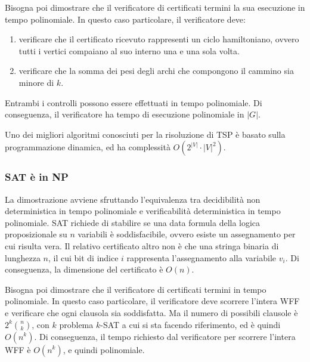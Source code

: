 Bisogna poi dimostrare che il verificatore di certificati termini la sua esecuzione in tempo polinomiale.
In questo caso particolare, il verificatore deve:
\begin{enumerate}
    \item verificare che il certificato ricevuto rappresenti un ciclo hamiltoniano, ovvero tutti i vertici compaiano al suo interno una e una sola volta.
    \item verificare che la somma dei pesi degli archi che compongono il cammino sia minore di $k$.
\end{enumerate}
Entrambi i controlli possono essere effettuati in tempo polinomiale.
Di conseguenza, il verificatore ha tempo di esecuzione polinomiale in $|G|$.

Uno dei migliori algoritmi conosciuti per la risoluzione di TSP è basato sulla programmazione dinamica, ed ha complessità $O(2^{|V|} \cdot |V|^2)$.

\subsubsection{SAT è in NP}
La dimostrazione avviene sfruttando l'equivalenza tra decidibilità non deterministica in tempo polinomiale e verificabilità deterministica in tempo polinomiale.
SAT richiede di stabilire se una data formula della logica proposizionale su $n$ variabili è soddisfacibile, ovvero esiste un assegnamento per cui risulta vera.
Il relativo certificato altro non è che una stringa binaria di lunghezza $n$, il cui bit di indice $i$ rappresenta l'assegnamento alla variabile $v_i$.
Di conseguenza, la dimensione del certificato è $O(n)$.

Bisogna poi dimostrare che il verificatore di certificati termini in tempo polinomiale. In questo caso particolare, il verificatore deve scorrere l'intera WFF e verificare che ogni clausola sia soddisfatta.
Ma il numero di possibili clausole è $2^k \binom{n}{k}$, con $k$ problema $k$-SAT a cui si sta facendo riferimento, ed è quindi $O(n^k)$.
Di conseguenza, il tempo richiesto dal verificatore per scorrere l'intera WFF è $O(n^k)$, e quindi polinomiale.